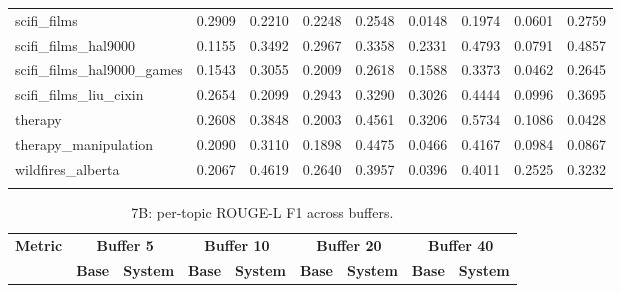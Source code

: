 \documentclass[pdflatex,sn-mathphys-num]{sn-jnl}%
\theoremstyle{thmstyleone}%
\theoremstyle{thmstyletwo}%
\theoremstyle{thmstylethree}%
\begin{document}
\begin{appendices}
\begin{landscape}
\begin{longtable}{@{}p{3.8cm}cccccccc@{}}
scifi\_films & 0.2909 & 0.2210 & 0.2248 & 0.2548 & 0.0148 & 0.1974 & 0.0601 & 0.2759 \\
scifi\_films\_hal9000 & 0.1155 & 0.3492 & 0.2967 & 0.3358 & 0.2331 & 0.4793 & 0.0791 & 0.4857 \\
scifi\_films\_hal9000\_games & 0.1543 & 0.3055 & 0.2009 & 0.2618 & 0.1588 & 0.3373 & 0.0462 & 0.2645 \\
scifi\_films\_liu\_cixin & 0.2654 & 0.2099 & 0.2943 & 0.3290 & 0.3026 & 0.4444 & 0.0996 & 0.3695 \\
therapy & 0.2608 & 0.3848 & 0.2003 & 0.4561 & 0.3206 & 0.5734 & 0.1086 & 0.0428 \\
therapy\_manipulation & 0.2090 & 0.3110 & 0.1898 & 0.4475 & 0.0466 & 0.4167 & 0.0984 & 0.0867 \\
wildfires\_alberta & 0.2067 & 0.4619 & 0.2640 & 0.3957 & 0.0396 & 0.4011 & 0.2525 & 0.3232 \\
\botrule
\end{longtable}
\normalsize
\end{landscape}
\begin{landscape}
\tiny
\begin{longtable}{@{}p{3.8cm}cccccccc@{}}
\caption{7B: per-topic ROUGE-L F1 across buffers.}\label{tab:app_7b_rougel_topics}\\

\toprule
\textbf{Metric} & \multicolumn{2}{c}{\textbf{Buffer 5}} & \multicolumn{2}{c}{\textbf{Buffer 10}} & \multicolumn{2}{c}{\textbf{Buffer 20}} & \multicolumn{2}{c}{\textbf{Buffer 40}} \\
\cmidrule(lr){2-3}\cmidrule(lr){4-5}\cmidrule(lr){6-7}\cmidrule(lr){8-9}
 & \textbf{Base} & \textbf{System} & \textbf{Base} & \textbf{System} & \textbf{Base} & \textbf{System} & \textbf{Base} & \textbf{System} \\
\midrule
\endfirsthead


\end{longtable}
\end{landscape}
\end{appendices}
\end{document}
